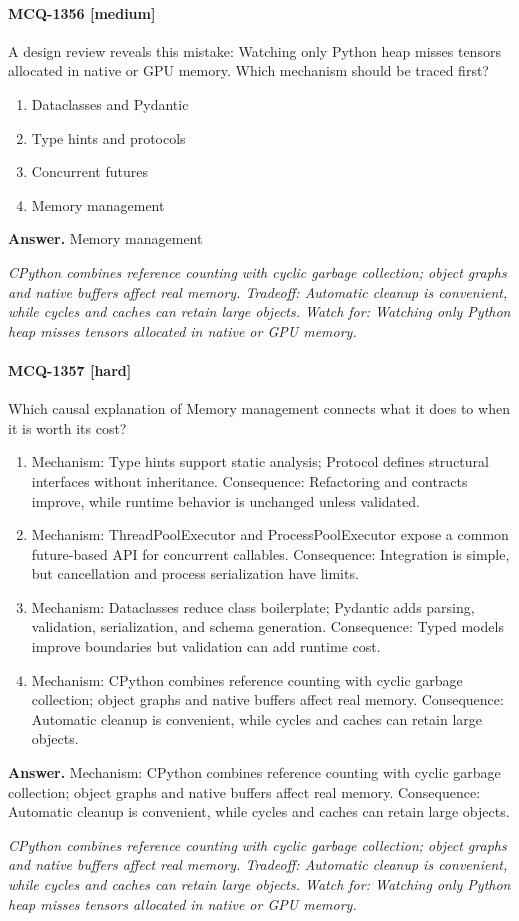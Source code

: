 \paragraph{MCQ-1356 [medium]} A design review reveals this mistake: Watching only Python heap misses tensors allocated in native or GPU memory. Which mechanism should be traced first?
\begin{enumerate}[label=\Alph*.]
\item Dataclasses and Pydantic
\item Type hints and protocols
\item Concurrent futures
\item Memory management
\end{enumerate}
\noindent\textbf{Answer.} Memory management
\par\textit{CPython combines reference counting with cyclic garbage collection; object graphs and native buffers affect real memory. Tradeoff: Automatic cleanup is convenient, while cycles and caches can retain large objects. Watch for: Watching only Python heap misses tensors allocated in native or GPU memory.}
\paragraph{MCQ-1357 [hard]} Which causal explanation of Memory management connects what it does to when it is worth its cost?
\begin{enumerate}[label=\Alph*.]
\item Mechanism: Type hints support static analysis; Protocol defines structural interfaces without inheritance. Consequence: Refactoring and contracts improve, while runtime behavior is unchanged unless validated.
\item Mechanism: ThreadPoolExecutor and ProcessPoolExecutor expose a common future-based API for concurrent callables. Consequence: Integration is simple, but cancellation and process serialization have limits.
\item Mechanism: Dataclasses reduce class boilerplate; Pydantic adds parsing, validation, serialization, and schema generation. Consequence: Typed models improve boundaries but validation can add runtime cost.
\item Mechanism: CPython combines reference counting with cyclic garbage collection; object graphs and native buffers affect real memory. Consequence: Automatic cleanup is convenient, while cycles and caches can retain large objects.
\end{enumerate}
\noindent\textbf{Answer.} Mechanism: CPython combines reference counting with cyclic garbage collection; object graphs and native buffers affect real memory. Consequence: Automatic cleanup is convenient, while cycles and caches can retain large objects.
\par\textit{CPython combines reference counting with cyclic garbage collection; object graphs and native buffers affect real memory. Tradeoff: Automatic cleanup is convenient, while cycles and caches can retain large objects. Watch for: Watching only Python heap misses tensors allocated in native or GPU memory.}
